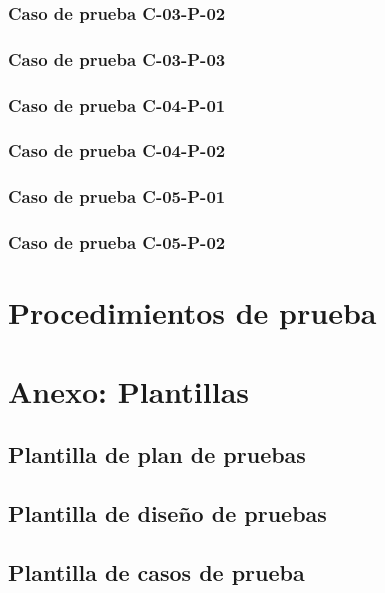 \documentclass[10pt,a4paper]{article}
\begin{document}
			\subsubsection{Caso de prueba C-03-P-02}

			\subsubsection{Caso de prueba C-03-P-03}

			\subsubsection{Caso de prueba C-04-P-01}

			\subsubsection{Caso de prueba C-04-P-02}

			\subsubsection{Caso de prueba C-05-P-01}

			\subsubsection{Caso de prueba C-05-P-02}

\section{Procedimientos de prueba}

\section{Anexo: Plantillas}
	\subsection{Plantilla de plan de pruebas}

	\subsection{Plantilla de diseño de pruebas}

	\subsection{Plantilla de casos de prueba}

	
\end{document}
